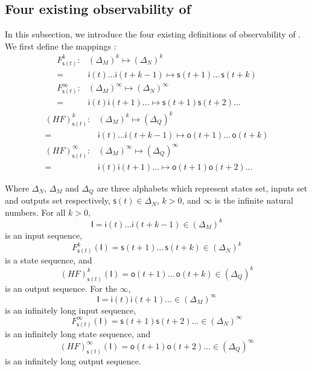 \subsection{Four existing observability of \BCNs}
In this subsection, we introduce the four existing definitions of observability of \BCNs. 
We first define the mappings \cite{Zhang2016Observability}:
\begin{equation}
\begin{split}
F^k_{\mathsf{s}(t)}:& (\Delta_M)^k\mapsto(\Delta_N)^k\\
=&\mathsf{i}(t)\ldots \mathsf{i}({t+k-1}) \mapsto \mathsf{s}(t+1) \ldots\, \mathsf{s}(t+k)\\
F^{\infty}_{\mathsf{s}(t)}:& (\Delta_M)^{\infty}\mapsto(\Delta_N)^{\infty}\\
 =&\mathsf{i}(t) \mathsf{i}(t+1) \ldots  \mapsto \mathsf{s}(t+1) \mathsf{s}(t+2) \ldots
\end{split}
\label{equ:5}
\end{equation}
\begin{equation}
\begin{split}
(HF)^k_{\mathsf{s}(t)}:& (\Delta_M)^k\mapsto(\Delta_Q)^k\\
=&\mathsf{i}(t)\ldots \mathsf{i}(t+k-1) \mapsto \mathsf{o}(t+1)\ldots\, \mathsf{o}(t+k)\\
(HF)^{\infty}_{\mathsf{s}(t)}:& (\Delta_M)^{\infty}\mapsto(\Delta_Q)^{\infty}\\
=&\mathsf{i}(t) \mathsf{i}(t+1) \ldots  \mapsto \mathsf{o}(t+1) \mathsf{o}(t+2)\ldots
\end{split}
\label{equ:6}
\end{equation}

Where $\Delta_N$, $\Delta_M$ and $\Delta_Q$ are three alphabets which represent states set, inputs set and outputs set respectively, $\mathsf{s}(t)\in \Delta_N$, $k>0$, and $\infty$ is the infinite natural numbers. For all  $k>0$,
\[\mathsf{I}=\mathsf{i}(t)\ldots \mathsf{i}({t+k-1}) \in(\Delta_M)^k\] 
is an input sequence, 
\[F^k_{\mathsf{s}(t)}(\mathsf{I})=\mathsf{s}(t+1) \ldots\, \mathsf{s}(t+k) \in(\Delta_N)^k\]
 is a state sequence, and 
 \[(HF)^k_{\mathsf{s}(t)}(\mathsf{I})=\mathsf{o}(t+1)\ldots\, \mathsf{o}(t+k) \in(\Delta_Q)^k\] 
 is an output sequence. For the $\infty$, 
 \[\mathsf{I}=\mathsf{i}(t) \mathsf{i}(t+1)\ldots  \in(\Delta_M)^{\infty}\] 
 is an infinitely long input sequence, 
 \[F^{\infty}_{\mathsf{s}(t)}(\mathsf{I})=\mathsf{s}(t+1) \mathsf{s}(t+2)\ldots  \in(\Delta_N)^{\infty}\] 
 is an infinitely long state sequence, and 
 \[(HF)^{\infty}_{\mathsf{s}(t)}(\mathsf{I})=\mathsf{o}(t+1) \mathsf{o}(t+2)\ldots \in(\Delta_Q)^{\infty}\]
  is an infinitely long output sequence. 
  

